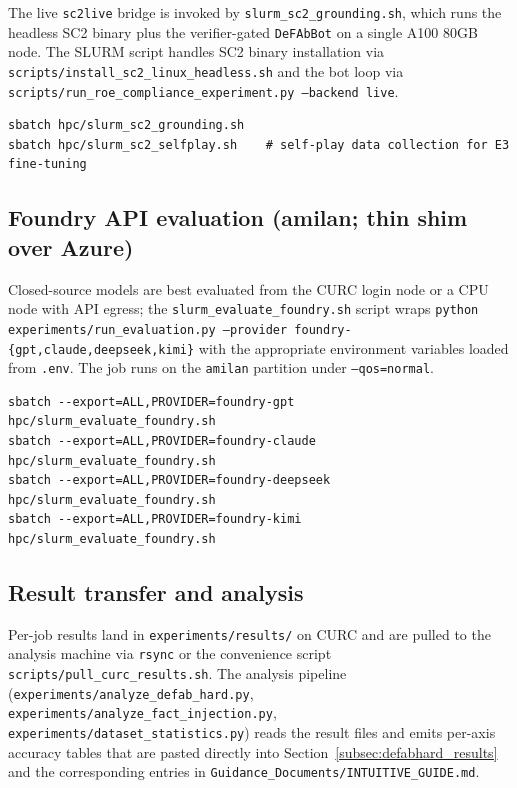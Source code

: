 \documentclass{article}
\theoremstyle{definition}
\begin{document}
The live \texttt{sc2live} bridge is invoked by \texttt{slurm\_sc2\_grounding.sh}, which runs the headless SC2 binary plus the verifier-gated \texttt{DeFAbBot} on a single A100 80GB node. The SLURM script handles SC2 binary installation via \texttt{scripts/install\_sc2\_linux\_headless.sh} and the bot loop via \texttt{scripts/run\_roe\_compliance\_experiment.py --backend live}.

\begin{verbatim}
sbatch hpc/slurm_sc2_grounding.sh
sbatch hpc/slurm_sc2_selfplay.sh    # self-play data collection for E3 fine-tuning
\end{verbatim}

\subsection{Foundry API evaluation (amilan; thin shim over Azure)}

Closed-source models are best evaluated from the CURC login node or a CPU node with API egress; the \texttt{slurm\_evaluate\_foundry.sh} script wraps \texttt{python experiments/run\_evaluation.py --provider foundry-\{gpt,claude,deepseek,kimi\}} with the appropriate environment variables loaded from \texttt{.env}. The job runs on the \texttt{amilan} partition under \texttt{--qos=normal}.

\begin{verbatim}
sbatch --export=ALL,PROVIDER=foundry-gpt      hpc/slurm_evaluate_foundry.sh
sbatch --export=ALL,PROVIDER=foundry-claude   hpc/slurm_evaluate_foundry.sh
sbatch --export=ALL,PROVIDER=foundry-deepseek hpc/slurm_evaluate_foundry.sh
sbatch --export=ALL,PROVIDER=foundry-kimi     hpc/slurm_evaluate_foundry.sh
\end{verbatim}

\subsection{Result transfer and analysis}

Per-job results land in \texttt{experiments/results/} on CURC and are pulled to the analysis machine via \texttt{rsync} or the convenience script \texttt{scripts/pull\_curc\_results.sh}. The analysis pipeline (\texttt{experiments/analyze\_defab\_hard.py}, \texttt{experiments/analyze\_fact\_injection.py}, \texttt{experiments/dataset\_statistics.py}) reads the result files and emits per-axis accuracy tables that are pasted directly into Section~\ref{subsec:defabhard_results} and the corresponding entries in \texttt{Guidance\_Documents/INTUITIVE\_GUIDE.md}.
\end{document}
